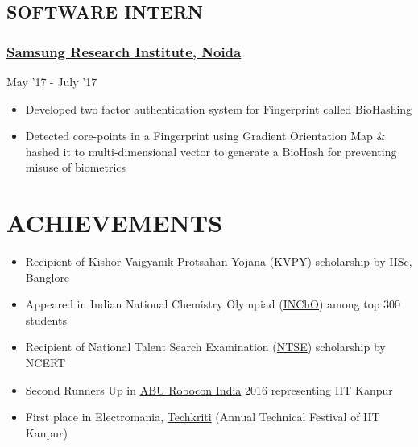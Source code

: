 \documentclass[letterpaper]{twentysecondcv} %
\begin{document}
\subsection{SOFTWARE INTERN}\subsubsection{\href{https://research.samsung.com/sri-n}{Samsung Research Institute, Noida}}\hfill{}  May '17 - July '17
\begin{itemize}
    \item Developed two factor authentication system for Fingerprint called BioHashing
\item Detected core-points in a Fingerprint using Gradient Orientation Map \& hashed it to multi-dimensional vector to generate a BioHash for preventing misuse of biometrics
\end{itemize}

\section{ACHIEVEMENTS}
\begin{itemize}
	\item Recipient of Kishor Vaigyanik Protsahan Yojana (\href{http://www.kvpy.iisc.ernet.in/main/index.htm}{KVPY}) scholarship by IISc, Banglore
	\item Appeared in Indian National Chemistry Olympiad (\href{http://chem.hbcse.tifr.res.in/in-india/}{INChO}) among top 300 students
	\item Recipient of National Talent Search Examination (\href{http://www.ncert.nic.in/programmes/talent_exam/index_talent.html}{NTSE}) scholarship by NCERT
	\item Second Runners Up in \href{http://www.roboconindia.com/}{ABU Robocon India} 2016 representing IIT Kanpur %
	\item First place in Electromania, \href{https://techkriti.org/}{Techkriti} (Annual Technical Festival of IIT Kanpur)
\end{itemize}
\end{document}
